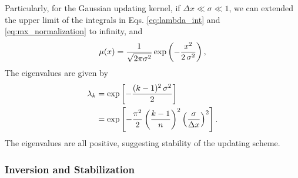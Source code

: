 \documentclass[reprint, floatfix]{revtex4-1}
\begin{document}
Particularly,
for the Gaussian updating kernel,
if $\Delta x \ll \sigma \ll 1$,
we can extended
the upper limit of the integrals
in Eqs. \eqref{eq:lambda_int}
and \eqref{eq:mx_normalization}
to infinity, and
%
\begin{equation}
\mu(x)
=
\frac{            1            }
     { \sqrt{ 2 \pi \sigma^2 } }
%
\exp\left(
      -\frac{       x^2     }
            { 2 \, \sigma^2 }
    \right),
\notag
\end{equation}
%
%
The eigenvalues are given by
%
\begin{align}
\lambda_k
&=
\exp\left[
      -\frac{ (k - 1)^2 \, \sigma^2 }
            {           2           }
    \right]
\notag
\\
&=
\exp\left[
      -\frac{ \pi^2 }{ 2 }
      \left(
        \frac{ k - 1 }
             {   n   }
      \right)^2
      \left(
        \frac{  \sigma }
             { \Delta x }
      \right)^2
    \right]
.
\notag
\end{align}
%
The eigenvalues are all positive,
suggesting stability of the updating scheme.





\subsubsection{\label{sec:stabilize_wband}
Inversion and Stabilization}
\end{document}
